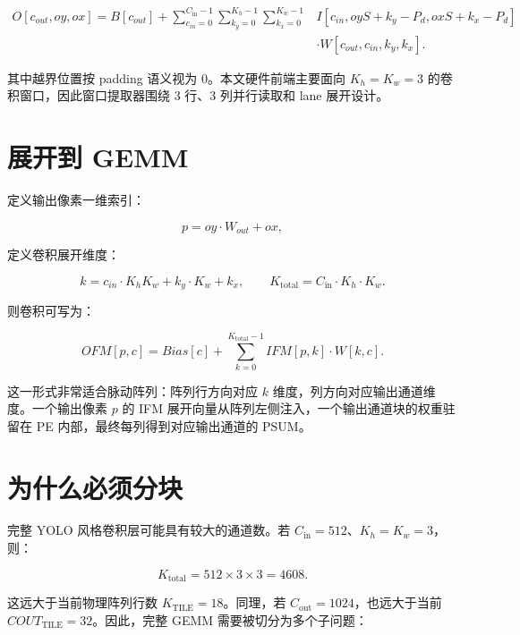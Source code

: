 \documentclass[fontset=fandol,ugly,language=chinese]{pkuthss}
\newcommand{\KTILE}{K_{\mathrm{TILE}}}
\newcommand{\COUTTILE}{COUT_{\mathrm{TILE}}}
\newcommand{\KTOTAL}{K_{\mathrm{total}}}
\newcommand{\COUT}{C_{\mathrm{out}}}
\newcommand{\CIN}{C_{\mathrm{in}}}
\begin{document}
\begin{equation}
\begin{aligned}
O[c_{out},oy,ox] =
B[c_{out}] +
\sum_{c_{in}=0}^{\CIN-1}
\sum_{k_y=0}^{K_h-1}
\sum_{k_x=0}^{K_w-1} & I[c_{in}, oyS+k_y-P_d, oxS+k_x-P_d]\\
& \cdot W[c_{out}, c_{in}, k_y, k_x].
\end{aligned}
\label{eq:conv_basic}
\end{equation}

其中越界位置按 padding 语义视为 0。本文硬件前端主要面向 $K_h=K_w=3$ 的卷积窗口，因此窗口提取器围绕 3 行、3 列并行读取和 lane 展开设计。

\section{展开到 GEMM}

定义输出像素一维索引：

\begin{equation}
p = oy \cdot W_{out} + ox,
\label{eq:p_index}
\end{equation}

定义卷积展开维度：

\begin{equation}
k = c_{in} \cdot K_h K_w + k_y \cdot K_w + k_x,\qquad
\KTOTAL = \CIN \cdot K_h \cdot K_w.
\label{eq:k_index}
\end{equation}

则卷积可写为：

\begin{equation}
OFM[p,c] = Bias[c] + \sum_{k=0}^{\KTOTAL-1} IFM[p,k] \cdot W[k,c].
\label{eq:gemm_basic}
\end{equation}

这一形式非常适合脉动阵列：阵列行方向对应 $k$ 维度，列方向对应输出通道维度。一个输出像素 $p$ 的 IFM 展开向量从阵列左侧注入，一个输出通道块的权重驻留在 PE 内部，最终每列得到对应输出通道的 PSUM。

\section{为什么必须分块}

完整 YOLO 风格卷积层可能具有较大的通道数。若 $\CIN=512$、$K_h=K_w=3$，则：

\begin{equation}
\KTOTAL = 512 \times 3 \times 3 = 4608.
\end{equation}

这远大于当前物理阵列行数 $\KTILE=18$。同理，若 $\COUT=1024$，也远大于当前 $\COUTTILE=32$。因此，完整 GEMM 需要被切分为多个子问题：
\end{document}
